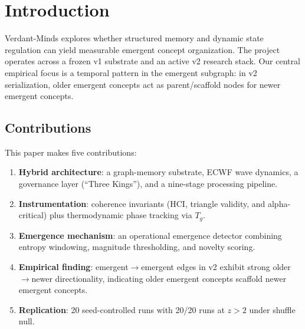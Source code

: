\section{Introduction}
Verdant-Minds explores whether structured memory and dynamic state regulation can yield measurable emergent concept organization. The project operates across a frozen v1 substrate and an active v2 research stack. Our central empirical focus is a temporal pattern in the emergent subgraph: in v2 serialization, older emergent concepts act as parent/scaffold nodes for newer emergent concepts.

\subsection{Contributions}
This paper makes five contributions:
\begin{enumerate}[leftmargin=*]
  \item \textbf{Hybrid architecture}: a graph-memory substrate, ECWF wave dynamics, a governance layer (``Three Kings''), and a nine-stage processing pipeline.
  \item \textbf{Instrumentation}: coherence invariants (HCI, triangle validity, and alpha-critical) plus thermodynamic phase tracking via $T_g$.
  \item \textbf{Emergence mechanism}: an operational emergence detector combining entropy windowing, magnitude thresholding, and novelty scoring.
  \item \textbf{Empirical finding}: emergent$\rightarrow$emergent edges in v2 exhibit strong older$\rightarrow$newer directionality, indicating older emergent concepts scaffold newer emergent concepts.
  \item \textbf{Replication}: 20 seed-controlled runs with 20/20 runs at $z>2$ under shuffle null.
\end{enumerate}
